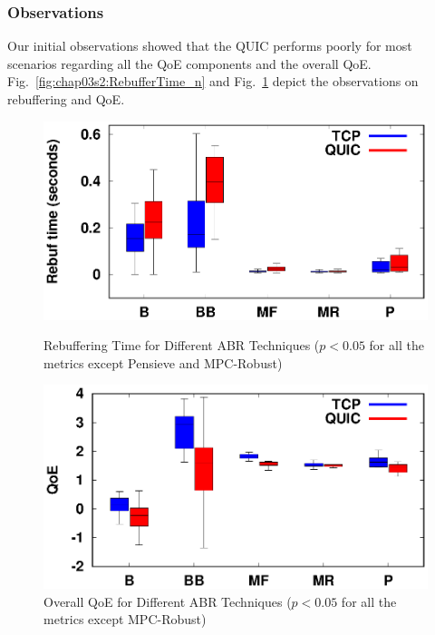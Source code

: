 \subsubsection{Observations}
Our initial observations showed that the QUIC performs poorly for most scenarios regarding all the QoE components and the overall QoE. Fig.~\ref{fig:chap03s2:RebufferTime_n} and Fig.~\ref{fig:chap03s2:QOE_n} depict the observations on rebuffering and QoE.

\begin{figure}[!h]
	\begin{minipage}[t]{0.48\linewidth}
		\includegraphics[width=\linewidth]{img/QUIC/rebuf_box}
		\caption{\label{fig:chap03s2:RebufferTime_n}Rebuffering Time for Different ABR Techniques ($p<0.05$ for all the metrics except Pensieve and MPC-Robust)}
	\end{minipage}\hfill
	\begin{minipage}[t]{0.48\linewidth}
		\includegraphics[width=\linewidth]{img/QUIC/qoe_box}
		\caption{\label{fig:chap03s2:QOE_n}Overall QoE for Different ABR Techniques ($p<0.05$ for all the metrics except MPC-Robust)}
	\end{minipage}
\end{figure}

